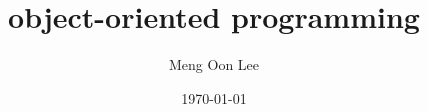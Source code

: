 \documentclass[12pt, a4paper]{article}
\title{object-oriented programming}
\author{Meng Oon Lee}
\date{\today}
\begin{document}
\maketitle

\clearpage

\glsaddall
\printglossaries
\end{document}
